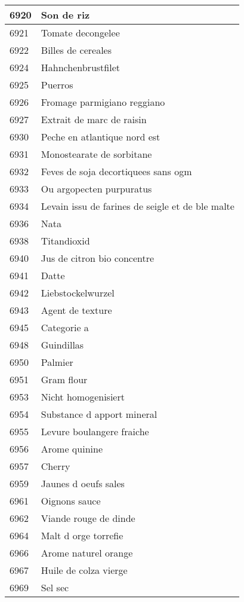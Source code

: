 \begin{longtable}{|l|l|}
6920 & Son de riz \\ \hline 
6921 & Tomate decongelee \\ \hline 
6922 & Billes de cereales \\ \hline 
6924 & Hahnchenbrustfilet \\ \hline 
6925 & Puerros \\ \hline 
6926 & Fromage parmigiano reggiano \\ \hline 
6927 & Extrait de marc de raisin \\ \hline 
6930 & Peche en atlantique nord est \\ \hline 
6931 & Monostearate de sorbitane \\ \hline 
6932 & Feves de soja decortiquees sans ogm \\ \hline 
6933 & Ou argopecten purpuratus \\ \hline 
6934 & Levain issu de farines de seigle et de ble malte \\ \hline 
6936 & Nata \\ \hline 
6938 & Titandioxid \\ \hline 
6940 & Jus de citron bio concentre \\ \hline 
6941 & Datte \\ \hline 
6942 & Liebstockelwurzel \\ \hline 
6943 & Agent de texture \\ \hline 
6945 & Categorie a \\ \hline 
6948 & Guindillas \\ \hline 
6950 & Palmier \\ \hline 
6951 & Gram flour \\ \hline 
6953 & Nicht homogenisiert \\ \hline 
6954 & Substance d apport mineral \\ \hline 
6955 & Levure boulangere fraiche \\ \hline 
6956 & Arome quinine \\ \hline 
6957 & Cherry \\ \hline 
6959 & Jaunes d oeufs sales \\ \hline 
6961 & Oignons sauce \\ \hline 
6962 & Viande rouge de dinde \\ \hline 
6964 & Malt d orge torrefie \\ \hline 
6966 & Arome naturel orange \\ \hline 
6967 & Huile de colza vierge \\ \hline 
6969 & Sel sec \\ \hline 

\end{longtable}
